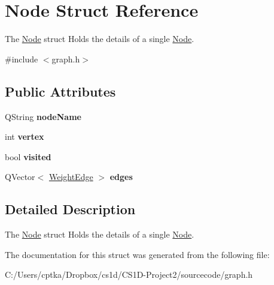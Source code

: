 \hypertarget{struct_node}{}\section{Node Struct Reference}
\label{struct_node}


The \mbox{\hyperlink{struct_node}{Node}} struct Holds the details of a single \mbox{\hyperlink{struct_node}{Node}}.  




{\ttfamily \#include $<$graph.\+h$>$}

\subsection*{Public Attributes}
\begin{DoxyCompactItemize}
\item 
\mbox{\label{struct_node_ad367b1fbffb895fbdadb3592908286ee}} 
Q\+String {\bfseries node\+Name}
\item 
\mbox{\label{struct_node_af933244c6bb8963a28837c7ed2883b93}} 
int {\bfseries vertex}
\item 
\mbox{\label{struct_node_aa1bdec4e775fc578632e6a2dced9e251}} 
bool {\bfseries visited}
\item 
\mbox{\label{struct_node_ad44b2d33d2f2dcfa0accbd4e4a7a19c5}} 
Q\+Vector$<$ \mbox{\hyperlink{struct_weight_edge}{Weight\+Edge}} $>$ {\bfseries edges}
\end{DoxyCompactItemize}


\subsection{Detailed Description}
The \mbox{\hyperlink{struct_node}{Node}} struct Holds the details of a single \mbox{\hyperlink{struct_node}{Node}}. 

The documentation for this struct was generated from the following file\+:\begin{DoxyCompactItemize}
\item 
C\+:/\+Users/cptka/\+Dropbox/cs1d/\+C\+S1\+D-\/\+Project2/sourcecode/graph.\+h\end{DoxyCompactItemize}
